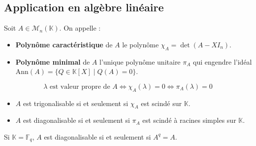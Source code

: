   \subsection{Application en algèbre linéaire}


  \begin{definition}
    Soit $A \in \mathcal{M}_n(\mathbb{K})$. On appelle :
    \begin{itemize}
      \item \textbf{Polynôme caractéristique} de $A$ le polynôme $\chi_A = \det(A - XI_n)$.
      \item \textbf{Polynôme minimal} de $A$ l'unique polynôme unitaire $\pi_A$ qui engendre l'idéal $\mathrm{Ann}(A) = \{ Q \in \mathbb{K}[X] \mid Q(A) = 0 \}$.
    \end{itemize}
  \end{definition}


  \begin{proposition}
    \[ \lambda \text{ est valeur propre de } A \iff \chi_A(\lambda) = 0 \iff \pi_A(\lambda) = 0 \]
  \end{proposition}


  \begin{proposition}
    \begin{itemize}
      \item $A$ est trigonalisable si et seulement si $\chi_A$ est scindé sur $\mathbb{K}$.
      \item $A$ est diagonalisable si et seulement si $\pi_A$ est scindé à racines simples sur $\mathbb{K}$.
    \end{itemize}
  \end{proposition}

  \begin{corollary}
    Si $\mathbb{K} = \mathbb{F}_q$, $A$ est diagonalisable si et seulement si $A^q = A$.
  \end{corollary}

